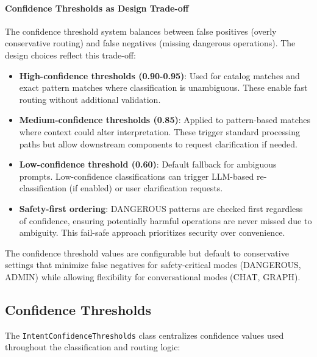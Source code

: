 \documentclass[a4paper,twoside]{sapthesis}
\begin{document}
\paragraph{Confidence Thresholds as Design Trade-off}

The confidence threshold system balances between false positives (overly conservative routing) and false negatives (missing dangerous operations). The design choices reflect this trade-off:

\begin{itemize}
    \item \textbf{High-confidence thresholds (0.90-0.95)}: Used for catalog matches and exact pattern matches where classification is unambiguous. These enable fast routing without additional validation.
    
    \item \textbf{Medium-confidence thresholds (0.85)}: Applied to pattern-based matches where context could alter interpretation. These trigger standard processing paths but allow downstream components to request clarification if needed.
    
    \item \textbf{Low-confidence threshold (0.60)}: Default fallback for ambiguous prompts. Low-confidence classifications can trigger LLM-based re-classification (if enabled) or user clarification requests.
    
    \item \textbf{Safety-first ordering}: DANGEROUS patterns are checked first regardless of confidence, ensuring potentially harmful operations are never missed due to ambiguity. This fail-safe approach prioritizes security over convenience.
\end{itemize}

The confidence threshold values are configurable but default to conservative settings that minimize false negatives for safety-critical modes (DANGEROUS, ADMIN) while allowing flexibility for conversational modes (CHAT, GRAPH).

\subsection{Confidence Thresholds}

The \texttt{IntentConfidenceThresholds} class centralizes confidence values used throughout the classification and routing logic:
\end{document}
